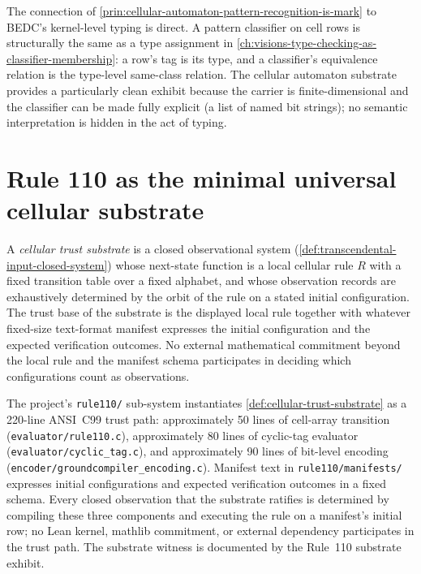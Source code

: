 \begin{remark}
\label{rem:cellular-automaton-classifier-vs-typing}
The connection of \autoref{prin:cellular-automaton-pattern-recognition-is-mark} to BEDC's kernel-level typing is direct. A pattern classifier on cell rows is structurally the same as a type assignment in \autoref{ch:visions-type-checking-as-classifier-membership}: a row's tag is its type, and a classifier's equivalence relation is the type-level same-class relation. The cellular automaton substrate provides a particularly clean exhibit because the carrier is finite-dimensional and the classifier can be made fully explicit (a list of named bit strings); no semantic interpretation is hidden in the act of typing.
\end{remark}

\section{Rule 110 as the minimal universal cellular substrate}
\label{sec:cellular-automaton-reading-rule110-minimal}

\begin{definition}
\label{def:cellular-trust-substrate}
A \emph{cellular trust substrate} is a closed observational system (\autoref{def:transcendental-input-closed-system}) whose next-state function is a local cellular rule $R$ with a fixed transition table over a fixed alphabet, and whose observation records are exhaustively determined by the orbit of the rule on a stated initial configuration. The trust base of the substrate is the displayed local rule together with whatever fixed-size text-format manifest expresses the initial configuration and the expected verification outcomes. No external mathematical commitment beyond the local rule and the manifest schema participates in deciding which configurations count as observations.
\end{definition}

\begin{example}
\label{ex:cellular-trust-substrate-rule110}
The project's \texttt{rule110/} sub-system instantiates \autoref{def:cellular-trust-substrate} as a 220-line ANSI~C99 trust path: approximately 50 lines of cell-array transition (\texttt{evaluator/rule110.c}), approximately 80 lines of cyclic-tag evaluator (\texttt{evaluator/cyclic\_tag.c}), and approximately 90 lines of bit-level encoding (\texttt{encoder/groundcompiler\_encoding.c}). Manifest text in \texttt{rule110/manifests/} expresses initial configurations and expected verification outcomes in a fixed schema. Every closed observation that the substrate ratifies is determined by compiling these three components and executing the rule on a manifest's initial row; no Lean kernel, mathlib commitment, or external dependency participates in the trust path. The substrate witness is documented by the Rule~110 substrate exhibit.
\end{example}

